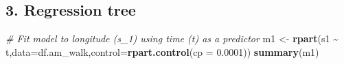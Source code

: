 \documentclass[
]{book}
\newenvironment{Shaded}{\begin{snugshade}}{\end{snugshade}}
\newcommand{\AttributeTok}[1]{\textcolor[rgb]{0.13,0.29,0.53}{#1}}
\newcommand{\CommentTok}[1]{\textcolor[rgb]{0.56,0.35,0.01}{\textit{#1}}}
\newcommand{\FloatTok}[1]{\textcolor[rgb]{0.00,0.00,0.81}{#1}}
\newcommand{\FunctionTok}[1]{\textcolor[rgb]{0.13,0.29,0.53}{\textbf{#1}}}
\newcommand{\NormalTok}[1]{#1}
\newcommand{\OtherTok}[1]{\textcolor[rgb]{0.56,0.35,0.01}{#1}}
\newcommand{\SpecialCharTok}[1]{\textcolor[rgb]{0.81,0.36,0.00}{\textbf{#1}}}
\begin{document}
\hypertarget{regression-tree}{%
\subsection{3. Regression tree}\label{regression-tree}}

\begin{Shaded}
\begin{Highlighting}[]
\CommentTok{\# Fit model to longitude (s\_1) using time (t) as a predictor}
\NormalTok{m1 }\OtherTok{\textless{}{-}} \FunctionTok{rpart}\NormalTok{(s1 }\SpecialCharTok{\textasciitilde{}}\NormalTok{ t,}\AttributeTok{data=}\NormalTok{df.am\_walk,}\AttributeTok{control=}\FunctionTok{rpart.control}\NormalTok{(}\AttributeTok{cp =} \FloatTok{0.0001}\NormalTok{))}
\FunctionTok{summary}\NormalTok{(m1)}
\end{Highlighting}
\end{Shaded}
\end{document}
